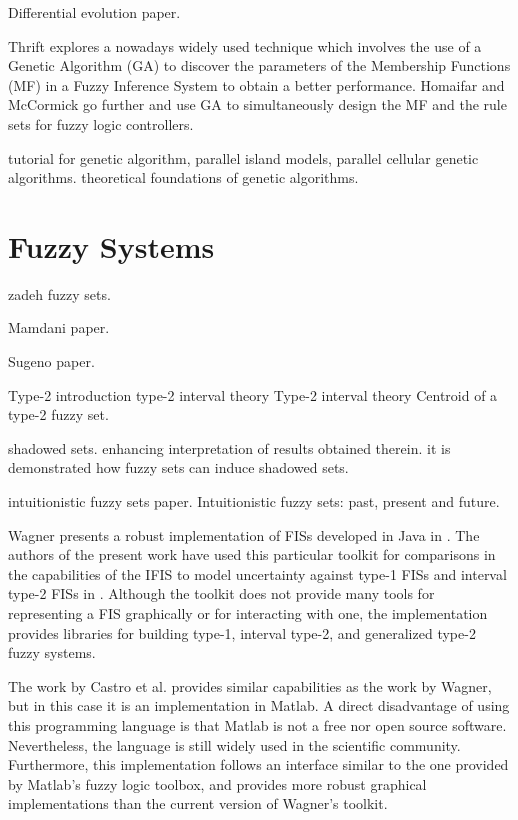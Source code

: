 \cite{Price1997} Differential evolution paper.

Thrift \cite{Thrift1991} explores a nowadays widely used technique which
involves the use of a Genetic Algorithm (GA) to discover the parameters of the
Membership Functions (MF) in a Fuzzy Inference System to obtain a better
performance. Homaifar and McCormick \cite{Homaifar1995} go further and use GA to
simultaneously design the MF and the rule sets for fuzzy logic controllers.

\cite{Whitley1994} tutorial for genetic algorithm, parallel island models,
parallel cellular genetic algorithms. theoretical foundations of genetic
algorithms.

\section{Fuzzy Systems}
\label{section:fuzzy-systems}

\cite{Zadeh1965} zadeh fuzzy sets.

\cite{Mamdani1975} Mamdani paper.

\cite{Takagi1985} Sugeno paper.


\cite{Mendel2002} Type-2 introduction \cite{Mendel2006} type-2 interval theory
\cite{Liang2000} Type-2 interval theory \cite{Karnik2001} Centroid of a type-2
fuzzy set.

\cite{Pedrycz1998} shadowed sets. enhancing interpretation of results obtained
therein. it is demonstrated how fuzzy sets can induce shadowed sets.

\cite{Atanassov1986} intuitionistic fuzzy sets paper.  \cite{Atanassov2003}
Intuitionistic fuzzy sets: past, present and future.


Wagner presents a robust implementation of FISs developed in Java in
\cite{Wagner2013}. The authors of the present work have used this particular
toolkit for comparisons in the capabilities of the IFIS to model uncertainty
against type-1 FISs and interval type-2 FISs in
\cite{Hernandez-Aguila2016}. Although the toolkit does not provide many tools
for representing a FIS graphically or for interacting with one, the
implementation provides libraries for building type-1, interval type-2, and
generalized type-2 fuzzy systems.

The work by Castro et al. \cite{castro2007interval} provides similar
capabilities as the work by Wagner, but in this case it is an implementation in
Matlab. A direct disadvantage of using this programming language is that Matlab
is not a free nor open source software.  Nevertheless, the language is still
widely used in the scientific community. Furthermore, this implementation
follows an interface similar to the one provided by Matlab's fuzzy logic
toolbox, and provides more robust graphical implementations than the current
version of Wagner's toolkit.

